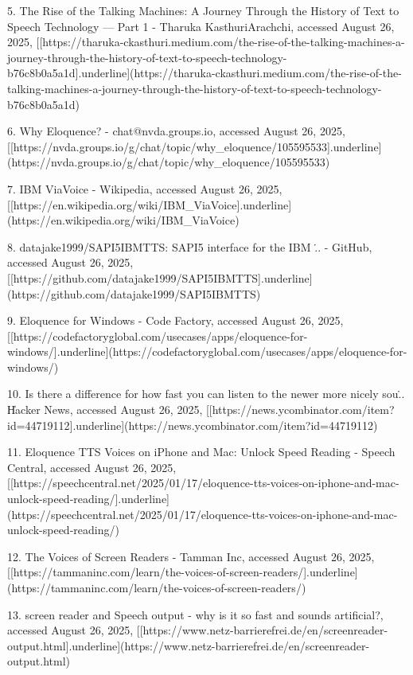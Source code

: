 5.  The Rise of the Talking Machines: A Journey Through the History of
    Text to Speech Technology --- Part 1 - Tharuka KasthuriArachchi,
    accessed August 26, 2025,
    [[https://tharuka-ckasthuri.medium.com/the-rise-of-the-talking-machines-a-journey-through-the-history-of-text-to-speech-technology-b76c8b0a5a1d]{.underline}](https://tharuka-ckasthuri.medium.com/the-rise-of-the-talking-machines-a-journey-through-the-history-of-text-to-speech-technology-b76c8b0a5a1d)

6.  Why Eloquence? - chat@nvda.groups.io, accessed August 26, 2025,
    [[https://nvda.groups.io/g/chat/topic/why_eloquence/105595533]{.underline}](https://nvda.groups.io/g/chat/topic/why_eloquence/105595533)

7.  IBM ViaVoice - Wikipedia, accessed August 26, 2025,
    [[https://en.wikipedia.org/wiki/IBM_ViaVoice]{.underline}](https://en.wikipedia.org/wiki/IBM_ViaVoice)

8.  datajake1999/SAPI5IBMTTS: SAPI5 interface for the IBM \... - GitHub,
    accessed August 26, 2025,
    [[https://github.com/datajake1999/SAPI5IBMTTS]{.underline}](https://github.com/datajake1999/SAPI5IBMTTS)

9.  Eloquence for Windows - Code Factory, accessed August 26, 2025,
    [[https://codefactoryglobal.com/usecases/apps/eloquence-for-windows/]{.underline}](https://codefactoryglobal.com/usecases/apps/eloquence-for-windows/)

10. Is there a difference for how fast you can listen to the newer more
    nicely sou\... \| Hacker News, accessed August 26, 2025,
    [[https://news.ycombinator.com/item?id=44719112]{.underline}](https://news.ycombinator.com/item?id=44719112)

11. Eloquence TTS Voices on iPhone and Mac: Unlock Speed Reading -
    Speech Central, accessed August 26, 2025,
    [[https://speechcentral.net/2025/01/17/eloquence-tts-voices-on-iphone-and-mac-unlock-speed-reading/]{.underline}](https://speechcentral.net/2025/01/17/eloquence-tts-voices-on-iphone-and-mac-unlock-speed-reading/)

12. The Voices of Screen Readers - Tamman Inc, accessed August 26, 2025,
    [[https://tammaninc.com/learn/the-voices-of-screen-readers/]{.underline}](https://tammaninc.com/learn/the-voices-of-screen-readers/)

13. screen reader and Speech output - why is it so fast and sounds
    artificial?, accessed August 26, 2025,
    [[https://www.netz-barrierefrei.de/en/screenreader-output.html]{.underline}](https://www.netz-barrierefrei.de/en/screenreader-output.html)

